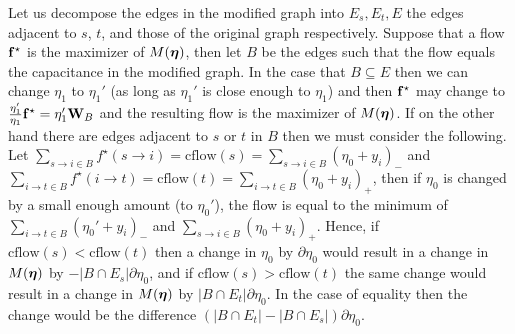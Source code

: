 Let us decompose the edges in the modified graph into $E_s, E_t, E$ the edges adjacent to $s$, $t$, and those of the original graph respectively.
Suppose that a flow $\mathbf{f}^\star$ is the maximizer of $M(\bm{\eta})$, then let $B$ be the edges such that the flow equals the capacitance in the modified graph.
In the case that $B \subseteq E$ then we can change $\eta_1$ to $\eta_1'$ (as long as $\eta_1'$ is close enough to $\eta_1$) and then $\mathbf{f}^\star$ may change to $\frac{\eta_1'}{\eta_1} \mathbf{f}^\star = \eta_1' \mathbf{W}_B$ and the resulting flow is the maximizer of $M(\bm{\eta})$.
If on the other hand there are edges adjacent to $s$ or $t$ in $B$ then we must consider the following.
Let $\sum_{s\rightarrow i \in B} f^\star(s \rightarrow i) = \textrm{cflow}(s) = \sum_{s\rightarrow i \in B} (\eta_0 + y_i)_-$ and $\sum_{i\rightarrow t \in B} f^\star(i \rightarrow t) = \textrm{cflow}(t) = \sum_{i\rightarrow t \in B} (\eta_0 + y_i)_+$, then if $\eta_0$ is changed by a small enough amount (to $\eta_0'$), the flow is equal to the minimum of $\sum_{i\rightarrow t \in B} (\eta_0' + y_i)_-$ and $\sum_{s\rightarrow i \in B} (\eta_0 + y_i)_+$.
Hence, if $\textrm{cflow}(s) < \textrm{cflow}(t)$ then a change in $\eta_0$ by $\partial \eta_0$ would result in a change in $M(\bm{\eta})$ by $-|B \cap E_s| \partial \eta_0$, and if $\textrm{cflow}(s) > \textrm{cflow}(t)$ the same change would result in a change in $M(\bm{\eta})$ by $|B \cap E_t| \partial \eta_0$.
In the case of equality then the change would be the difference $(|B \cap E_t| - |B \cap E_s|) \partial \eta_0$.


